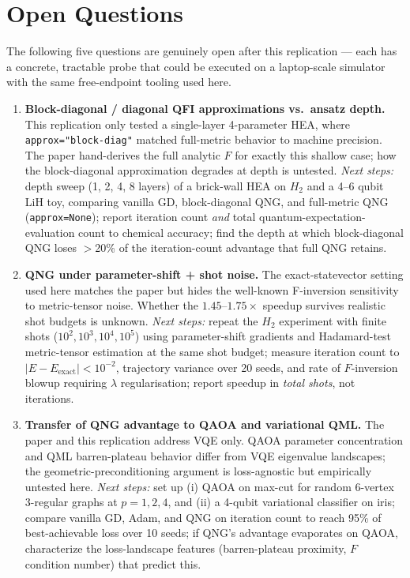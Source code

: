 \section{Open Questions}
\label{sec:open-questions}

The following five questions are genuinely open after this replication --- each has a
concrete, tractable probe that could be executed on a laptop-scale simulator with the
same free-endpoint tooling used here.

\begin{enumerate}
  \item \textbf{Block-diagonal / diagonal QFI approximations vs.\ ansatz depth.}
    This replication only tested a single-layer 4-parameter HEA, where
    \texttt{approx="block-diag"} matched full-metric behavior to machine precision. The paper
    hand-derives the full analytic $F$ for exactly this shallow case; how the block-diagonal
    approximation degrades at depth is untested.
    \emph{Next steps:} depth sweep (1, 2, 4, 8 layers) of a brick-wall HEA on $H_2$ and a 4--6
    qubit LiH toy, comparing vanilla GD, block-diagonal QNG, and full-metric QNG
    (\texttt{approx=None}); report iteration count \emph{and} total quantum-expectation-evaluation
    count to chemical accuracy; find the depth at which block-diagonal QNG loses $>$20\% of the
    iteration-count advantage that full QNG retains.

  \item \textbf{QNG under parameter-shift + shot noise.}
    The exact-statevector setting used here matches the paper but hides the well-known
    F-inversion sensitivity to metric-tensor noise. Whether the $1.45$--$1.75\times$ speedup
    survives realistic shot budgets is unknown.
    \emph{Next steps:} repeat the $H_2$ experiment with finite shots
    ($10^2,10^3,10^4,10^5$) using parameter-shift gradients and Hadamard-test metric-tensor
    estimation at the same shot budget; measure iteration count to $|E-E_{\text{exact}}|<10^{-2}$,
    trajectory variance over 20 seeds, and rate of $F$-inversion blowup requiring $\lambda$
    regularisation; report speedup in \emph{total shots}, not iterations.

  \item \textbf{Transfer of QNG advantage to QAOA and variational QML.}
    The paper and this replication address VQE only. QAOA parameter concentration and
    QML barren-plateau behavior differ from VQE eigenvalue landscapes; the geometric-preconditioning
    argument is loss-agnostic but empirically untested here.
    \emph{Next steps:} set up (i) QAOA on max-cut for random 6-vertex 3-regular graphs at
    $p=1,2,4$, and (ii) a 4-qubit variational classifier on iris; compare vanilla GD, Adam, and
    QNG on iteration count to reach 95\% of best-achievable loss over 10 seeds; if QNG's advantage
    evaporates on QAOA, characterize the loss-landscape features (barren-plateau proximity,
    $F$ condition number) that predict this.


\end{enumerate}
